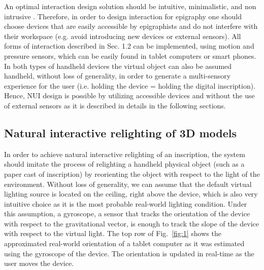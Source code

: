 \documentclass[amsthm,ebook]{saparticle}
\begin{document}
An optimal interaction design solution should be intuitive, minimalistic, and non intrusive \citep{preece_interaction_2015}.
Therefore, in order to design interaction for epigraphy one should choose devices that are easily accessible by
epigraphists and do not interfere with their workspace (e.g. avoid introducing new devices or external sensors). All
forms of interaction described in Sec. 1.2 can be implemented, using motion and pressure sensors, which can be easily
found in tablet computers or smart phones. In both types of handheld devices the virtual object can also be assumed
handheld, without loss of generality, in order to generate a multi-sensory experience for the user (i.e. holding the
device = holding the digital inscription). Hence, NUI design is possible by utilizing accessible devices and
without the use of external sensors as it is described in details in the following sections.


\subsection{Natural interactive relighting of 3D models}


\noindent In order to achieve natural interactive relighting of an inscription, the system should imitate the process of
relighting a handheld physical object (such as a paper cast of inscription) by reorienting the object with respect to
the light of the environment. Without loss of generality, we can assume that the default virtual lighting source is
located on the ceiling, right above the device, which is also very intuitive choice as it is the most probable
real-world lighting condition. Under this assumption, a gyroscope, a sensor that tracks the orientation of the device
with respect to the gravitational vector, is enough to track the slope of the device with respect to the virtual light.
The top row of Fig.~\ref{fig:1} shows the approximated real-world orientation of a tablet computer as it was estimated using
the gyroscope of the device. The orientation is updated in real-time as the user moves the device.
\end{document}
